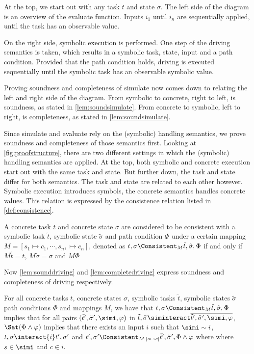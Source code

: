 At the top, we start out with any task $t$ and state $\sigma$.
The left side of the diagram is an overview of the evaluate function.
Inputs $i_1$ until $i_n$ are sequentially applied, until the task has an observable value.

On the right side, symbolic execution is performed.
One step of the driving semantics is taken, which results in a symbolic task, state, input
and a path condition.
Provided that the path condition holds, driving is executed sequentially until the symbolic task has an observable symbolic value.

Proving soundness and completeness of simulate now comes down to relating the left and right side of the diagram.
From symbolic to concrete, right to left, is soundness, as stated in \cref{lem:soundsimulate}.
From concrete to symbolic, left to right, is completeness, as stated in \cref{lem:soundsimulate}.

Since simulate and evaluate rely on the (symbolic) handling semantics,
we prove soundness and completeness of those semantics first.
Looking at \cref{fig:proofstructure}, there are two different settings in which the (symbolic) handling semantics are applied.
At the top, both symbolic and concrete execution start out with the same task and state.
But further down, the task and state differ for both semantics.
The task and state are related to each other however.
Symbolic execution introduces symbols, the concrete semantics handles concrete values.
This relation is expressed by the consistence relation listed in \cref{def:consistence}.

\begin{definition}
  \label{def:consistence}
A concrete task $t$ and concrete state $\sigma$
are considered to be consistent with a symbolic task $\tilde{t}$, symbolic state $\tilde{\sigma}$ and path condition $\Phi$
under a certain mapping $M=[s_1\mapsto c_1,\cdots,s_n,\mapsto c_n]$, denoted as $t,\sigma \Consistent_M \tilde{t},\tilde{\sigma},\Phi$
if and only if $M\tilde{t}=t$, $M\tilde{\sigma}=\sigma$ and $M\Phi$
\end{definition}

Now \cref{lem:sounddriving} and \cref{lem:completedriving} express soundness and completeness of driving respectively.

\begin{lemma}
  \label{lem:sounddriving}
  For all concrete tasks $t$, concrete states $\sigma$, symbolic tasks $\tilde{t}$, symbolic states $\tilde{\sigma}$ path conditions $\Phi$ and mappings $M$,
  we have that $t,\sigma\Consistent_M\tilde{t},\tilde{\sigma},\Phi$ implies
  that for all pairs $(\tilde{t}',\tilde{\sigma}',\simi,\phi)$ in $\tilde{t},\tilde{\sigma}\siminteract\overline{\tilde{t}',\tilde{\sigma}',\simi,\phi}$,
  $\Sat(\Phi\land\phi)$ implies that there exists an input $i$ such that $\simi\sim i$,  $t,\sigma\interact{i}t',\sigma'$ and $t',\sigma' \Consistent_{M.[s\mapsto c]} \tilde{t}',\tilde{\sigma}',\Phi\land\phi$ where where $s\in\simi$ and $c\in i$.
\end{lemma}


